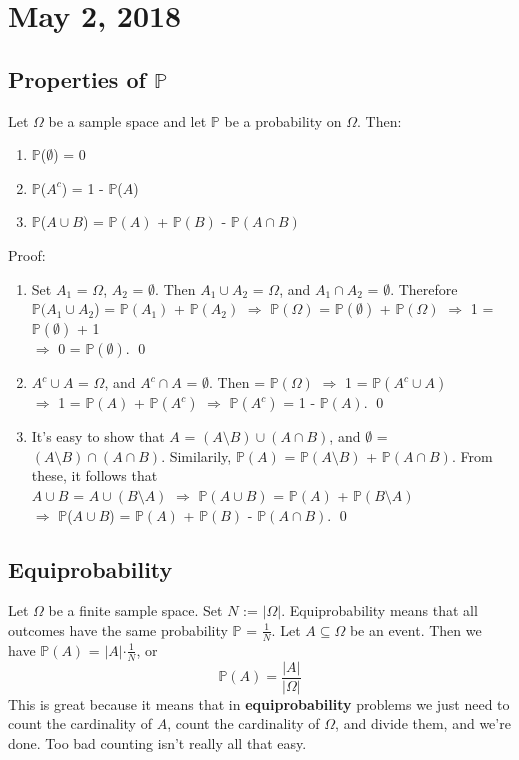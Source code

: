 \documentclass{article}
\newcommand{\bbP}{\mathbb{P}}
\newcommand{\Om}{\Omega}
\newcommand{\emp}{\emptyset}
\newcommand{\imply}{\Rightarrow}
\begin{document}

\section{May 2, 2018}
\subsection{Properties of $\bbP$}
Let $\Om$ be a sample space and let $\bbP$ be a probability on $\Om$. Then:
\begin{enumerate}
	\item $\bbP$($\emptyset$) = 0
	\item $\bbP$($A^{c}$) = 1 - $\bbP$($A$)
	\item $\bbP$($A \cup B$) = $\bbP(A)$ + $\bbP(B)$ - $\bbP(A \cap B)$
\end{enumerate}
Proof:
\begin{enumerate}
	\item Set $A_{1}$ = $\Om$, $A_{2}$ = $\emp$. Then $A_{1} \cup A_{2}$ = $\Om$, and $A_{1} \cap A_{2}$ = $\emp$. Therefore $\bbP(A_{1} \cup A_{2}$) = $\bbP(A_{1})$ + $\bbP(A_{2})$ $\imply$ $\bbP(\Om)$ = $\bbP(\emp)$ + $\bbP(\Om)$ $\imply$ 1 = $\bbP(\emp)$ + 1\\ $\imply$ 0 = $\bbP(\emp)$. \qed

	\item $A^{c} \cup A$ = $\Om$, and $A^{c} \cap A$ = $\emp$. Then = $\bbP(\Om)$ $\imply$ 1 = $\bbP(A^{c} \cup A)$\\ $\imply$ 1 = $\bbP(A)$ + $\bbP(A^{c})$ $\imply$ $\bbP(A^{c})$ = 1 - $\bbP(A)$. \qed

	\item It's easy to show that $A$ = $(A \setminus B) \cup (A \cap B)$, and $\emp$ = $(A \setminus B) \cap (A \cap B)$. Similarily, $\bbP(A)$ = $\bbP(A \setminus B)$ + $\bbP(A \cap B)$. From these, it follows that\\ $A \cup B$ = $A \cup (B \setminus A)$ $\imply$ $\bbP(A \cup B)$ = $\bbP(A)$ + $\bbP(B \setminus A)$\\ $\imply$ $\bbP$($A \cup B$) = $\bbP(A)$ + $\bbP(B)$ - $\bbP(A \cap B)$. \qed
\end{enumerate}

\subsection{Equiprobability}
Let $\Om$ be a finite sample space. Set $N$ := $|\Om|$. Equiprobability means that all outcomes have the same probability $\bbP$ = $\frac{1}{N}$. Let $A \subseteq \Om$ be an event. Then we have $\bbP(A)$ = $|A|$$\cdot$$\frac{1}{N}$, or 
\[\bbP(A) = \frac{|A|}{|\Om|}\]
This is great because it means that in \textbf{equiprobability} problems we just need to count the cardinality of $A$, count the cardinality of $\Om$, and divide them, and we're done. Too bad counting isn't really all that easy.
\end{document}
